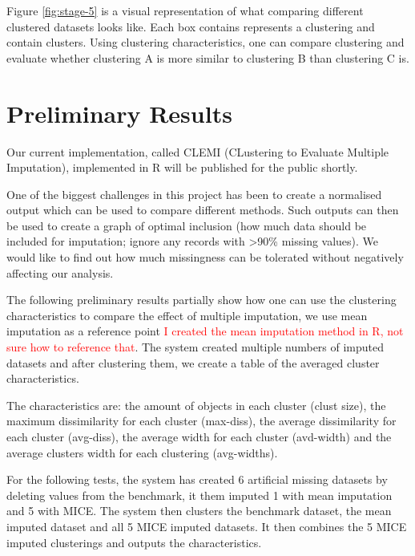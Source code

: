 \documentclass[conference,compsoc]{IEEEtran}
\begin{document}
		Figure \ref{fig:stage-5} is a visual representation of what comparing different clustered datasets looks like. Each box contains represents a clustering and contain clusters. Using clustering characteristics, one can compare clustering and evaluate whether clustering A is more similar to clustering B than clustering C is.

	\section{Preliminary Results} %
	\label{sec:preliminary_results}
	Our current implementation, called CLEMI (CLustering to Evaluate Multiple Imputation), implemented in R will be published for the public shortly. 

	One of the biggest challenges in this project has been to create a normalised output which can be used to compare different methods. Such outputs can then be used to create a graph of optimal inclusion (how much data should be included for imputation; ignore any records with >90\% missing values). We would like to find out how much missingness can be tolerated without negatively affecting our analysis. 

	The following preliminary results partially show how one can use the clustering characteristics to compare the effect of multiple imputation, we use mean imputation as a reference point \textcolor{red}{I created the mean imputation method in R, not sure how to reference that}. The system created multiple numbers of imputed datasets and after clustering them, we create a table of the averaged cluster characteristics. 

	The characteristics are: the amount of objects in each cluster (clust size), the maximum dissimilarity for each cluster (max-diss), the average dissimilarity for each cluster (avg-diss), the average width for each cluster (avd-width) and the average clusters width for each clustering (avg-widths). 

	For the following tests, the system has created 6 artificial missing datasets by deleting values from the benchmark, it them imputed 1 with mean imputation and 5 with MICE. The system then clusters the benchmark dataset, the mean imputed dataset and all 5 MICE imputed datasets. It then combines the 5 MICE imputed clusterings and outputs the characteristics.
	\\
\end{document}
